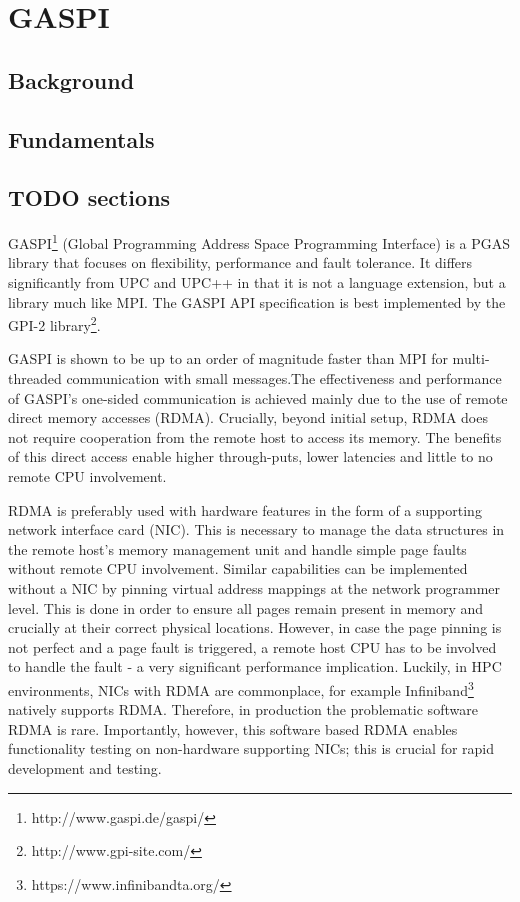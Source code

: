 \section{GASPI}

\subsection{Background} %

\subsection{Fundamentals}


\subsection{TODO sections}
GASPI\footnote{http://www.gaspi.de/gaspi/} (Global Programming Address Space Programming Interface) is a PGAS library that focuses on flexibility, performance and fault tolerance. It differs significantly from UPC and UPC++ in that it is not a language extension, but a library much like MPI. The GASPI API specification is best implemented by the GPI-2 library\footnote{http://www.gpi-site.com/}. 

GASPI is shown to be up to an order of magnitude faster than MPI for multi-threaded communication with small messages\cite{Evaluating_GASPI}.The effectiveness and performance of GASPI's one-sided communication is achieved mainly due to the use of remote direct memory accesses (RDMA). Crucially, beyond initial setup, RDMA  does not require cooperation from the remote host to access its memory. The benefits of this direct access enable higher through-puts, lower latencies and little to no  remote CPU involvement.

RDMA is preferably used with hardware features in the form of a supporting network interface card (NIC). This is necessary to manage the data structures in the remote host's memory management unit and handle simple page faults without remote CPU involvement. Similar capabilities can be implemented without a NIC by pinning virtual address mappings at the network programmer level. This is done in order to ensure all pages remain present in memory and crucially at their correct physical locations. However, in case the page pinning is not perfect and a page fault is triggered, a remote host CPU has to be involved to handle the fault - a very significant performance implication. Luckily, in HPC environments, NICs with RDMA are commonplace, for example Infiniband\footnote{https://www.infinibandta.org/} natively supports RDMA.  Therefore, in production the problematic software RDMA is rare. Importantly, however, this software based RDMA enables functionality testing on non-hardware supporting NICs; this is crucial for rapid development and testing. 

